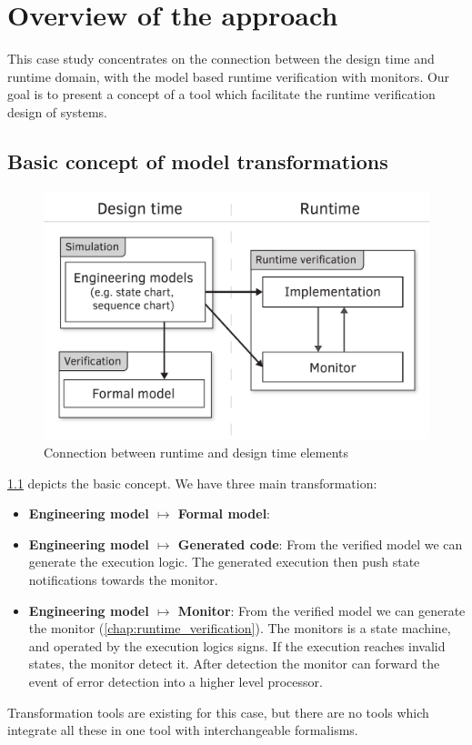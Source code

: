 \chapter{Overview of the approach}
\label{chap:overview}

This case study concentrates on the connection between the design time and runtime domain, with the model based runtime verification with monitors. Our goal is to present a concept of a tool which facilitate the runtime verification design of systems.

\section{Basic concept of model transformations}

\begin{figure}[h]
	\centering
	\includegraphics[width=0.6\linewidth]{include/figures/chapter_3/abstract_overview}
	\caption{Connection between runtime and design time elements}
	\label{fig:overview:abstract_overview}
\end{figure}

\cref{fig:overview:abstract_overview} depicts the basic concept. We have three main transformation:
\begin{itemize}
	\item \textbf{Engineering model $\mapsto$ Formal model}: 
	\item \textbf{Engineering model $\mapsto$ Generated code}: From the verified model we can generate the execution logic. The generated execution then push state notifications towards the monitor.
	\item \textbf{Engineering model $\mapsto$ Monitor}: From the verified model we can generate the monitor (\vref{chap:runtime_verification}). The monitors is a state machine, and operated by the execution logics signs. If the execution reaches invalid states, the monitor detect it. After detection the monitor can forward the event of error detection into a higher level processor.
\end{itemize}
Transformation tools are existing for this case, but there are no tools which integrate all these in one tool with interchangeable formalisms. 
\\[1ex]

